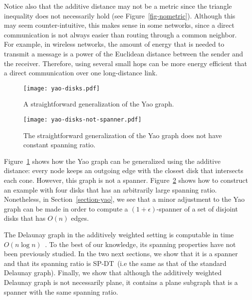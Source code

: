 \documentclass[pdftex,leqno,fleqn,12pt]{article}
\newcommand{\sdsr}{{\rm{SP-DT}}}
\begin{document}
Notice also that the additive distance may not be a metric since the triangle inequality does not
necessarily hold (see Figure~\ref{fig-nometric}). Although this may seem counter-intuitive, this
makes sense in some networks, since a direct communication is not always easier than routing
through a common neighbor. For example, in wireless networks, the amount of energy that is needed
to transmit a message is a power of the Euclidean distance between the sender and the receiver.
Therefore, using several small hops can be more energy efficient that a direct communication over
one long-distance link.

\begin{figure}[htb]
\begin{center}
\texttt{[image: yao-disks.pdf]} \caption{A straightforward generalization of the Yao graph.}\label{fig-yao-disks}
\end{center}
\end{figure}

\begin{figure}[htb]
\begin{center}
\texttt{[image: yao-disks-not-spanner.pdf]}\caption{The straightforward generalization of the Yao graph
does not have constant spanning ratio.}\label{fig-yao-disks-not-spanner}
\end{center}
\end{figure}

Figure~\ref{fig-yao-disks} shows how the Yao graph can be generalized using the
additive distance: every node keeps an outgoing edge with the closest disk that
intersects each cone. However, this graph is not a spanner.
Figure~\ref{fig-yao-disks-not-spanner} shows how to construct an example with
four disks that has an arbitrarily large spanning ratio. Nonetheless, in
Section~\ref{section-yao}, we see that a minor adjustment to the Yao graph can
be made in order to compute a $(1+\epsilon)$-spanner of a set of disjoint disks
that has $O(n)$ edges.


The Delaunay graph in the additively weighted setting is computable in time
$O(n\log n)$~\cite{fortune87}. To the best of our knowledge, its spanning
properties have not been previously studied. In the two next sections, we show
that it is a spanner and that its spanning ratio is \sdsr\ (i.e the same as
that of the standard Delaunay graph). Finally, we show that although the
additively weighted Delaunay graph is not necessarily plane,  it contains a
plane subgraph that is a spanner with the same spanning ratio.
\end{document}
